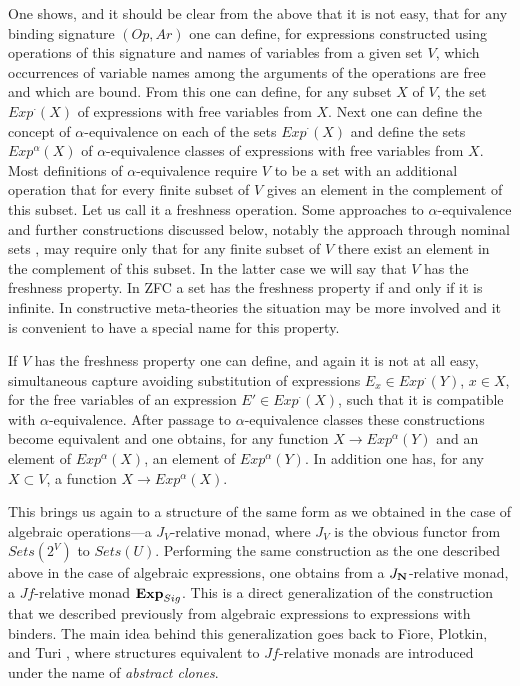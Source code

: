 \documentclass[12pt]{amsart}
\newcommand{\sr}{\rightarrow}
\newcommand{\nn}{{\bf N\rm}}
\newcommand{\nat}{\nn}
\begin{document}
One shows, and it should be clear from the above that it is not easy, that for
any binding signature $(Op,Ar)$ one can define, for expressions constructed
using operations of this signature and names of variables from a given set $V$,
which occurrences of variable names among the arguments of the operations are
free and which are bound. From this one can define, for any subset $X$ of $V$,
the set $Exp^{\cdot}(X)$ of expressions with free variables from $X$. Next one
can define the concept of $\alpha$-equivalence on each of the sets
$Exp^{\cdot}(X)$ and define the sets $Exp^{\alpha}(X)$ of $\alpha$-equivalence
classes of expressions with free variables from $X$. Most definitions of
$\alpha$-equivalence require $V$ to be a set with an additional operation that
for every finite subset of $V$ gives an element in the complement of this
subset. Let us call it a freshness operation. Some approaches to 
$\alpha$-equivalence and further constructions discussed below, notably the
approach through nominal sets \cite{Pitts}, may require only that for any
finite subset of $V$ there exist an element in the complement of this
subset. In the latter case we will say that $V$ has the freshness property. In
ZFC a set has the freshness property if and only if it is infinite. In
constructive meta-theories the situation may be more involved and it is
convenient to have a special name for this property.

If $V$ has the freshness property one can define, and again it is not at all
easy, simultaneous capture avoiding substitution of expressions 
$E_x\in Exp^{\cdot}(Y)$, $x\in X$, for the free variables of an expression 
$E' \in Exp^{\cdot}(X)$, such that it is compatible with $\alpha$-equivalence.
After passage to $\alpha$-equivalence classes these constructions
become equivalent and one obtains, for any function $X\sr Exp^{\alpha}(Y)$ and
an element of $Exp^{\alpha}(X)$, an element of $Exp^{\alpha}(Y)$. In addition
one has, for any $X\subset V$, a function $X\sr Exp^{\alpha}(X)$.

This brings us again to a structure of the same form as we obtained in the case
of algebraic operations---a $J_V$-relative monad, where $J_V$ is the obvious
functor from $Sets(2^V)$ to $Sets(U)$. Performing the same construction as the
one described above in the case of algebraic expressions, one obtains from a
$J_{\nat}$-relative monad, a $Jf$-relative monad ${\bf Exp}_{Sig}$. This is a
direct generalization of the construction that we described previously from
algebraic expressions to expressions with binders. The main idea behind this
generalization goes back to Fiore, Plotkin, and Turi \cite{FPT}, where structures
equivalent to $Jf$-relative monads are introduced under the name of
{\em abstract clones}.
\end{document}
